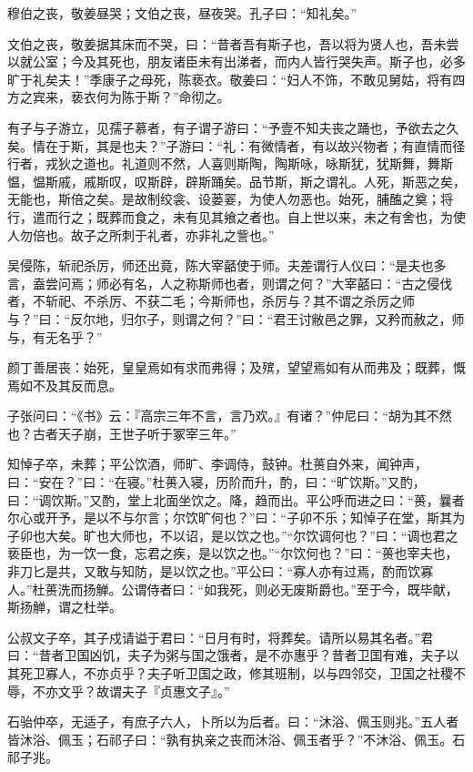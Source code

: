 \documentclass[]{article}
\begin{document}
穆伯之丧，敬姜昼哭；文伯之丧，昼夜哭。孔子曰：``知礼矣。''

文伯之丧，敬姜据其床而不哭，曰：``昔者吾有斯子也，吾以将为贤人也，吾未尝以就公室；今及其死也，朋友诸臣未有出涕者，而内人皆行哭失声。斯子也，必多旷于礼矣夫！''季康子之母死，陈亵衣。敬姜曰：``妇人不饰，不敢见舅姑，将有四方之宾来，亵衣何为陈于斯？''命彻之。

有子与子游立，见孺子慕者，有子谓子游曰：``予壹不知夫丧之踊也，予欲去之久矣。情在于斯，其是也夫？''子游曰：``礼：有微情者，有以故兴物者；有直情而径行者，戎狄之道也。礼道则不然，人喜则斯陶，陶斯咏，咏斯犹，犹斯舞，舞斯愠，愠斯戚，戚斯叹，叹斯辟，辟斯踊矣。品节斯，斯之谓礼。人死，斯恶之矣，无能也，斯倍之矣。是故制绞衾、设蒌翣，为使人勿恶也。始死，脯醢之奠；将行，遣而行之；既葬而食之，未有见其飨之者也。自上世以来，未之有舍也，为使人勿倍也。故子之所刺于礼者，亦非礼之訾也。''

吴侵陈，斩祀杀厉，师还出竟，陈大宰嚭使于师。夫差谓行人仪曰：``是夫也多言，盍尝问焉；师必有名，人之称斯师也者，则谓之何？''大宰嚭曰：``古之侵伐者，不斩祀、不杀厉、不获二毛；今斯师也，杀厉与？其不谓之杀厉之师与？''曰：``反尔地，归尔子，则谓之何？''曰：``君王讨敝邑之罪，又矜而赦之，师与，有无名乎？''

颜丁善居丧：始死，皇皇焉如有求而弗得；及殡，望望焉如有从而弗及；既葬，慨焉如不及其反而息。

子张问曰：``《书》云：『高宗三年不言，言乃欢。』有诸？''仲尼曰：``胡为其不然也？古者天子崩，王世子听于冢宰三年。''

知悼子卒，未葬；平公饮酒，师旷、李调侍，鼓钟。杜蒉自外来，闻钟声，曰：``安在？''曰：``在寝。''杜蒉入寝，历阶而升，酌，曰：``旷饮斯。''又酌，曰：``调饮斯。''又酌，堂上北面坐饮之。降，趋而出。平公呼而进之曰：``蒉，曩者尔心或开予，是以不与尔言；尔饮旷何也？''曰：``子卯不乐；知悼子在堂，斯其为子卯也大矣。旷也大师也，不以诏，是以饮之也。''``尔饮调何也？''曰：``调也君之亵臣也，为一饮一食，忘君之疾，是以饮之也。''``尔饮何也？''曰：``蒉也宰夫也，非刀匕是共，又敢与知防，是以饮之也。''平公曰：``寡人亦有过焉，酌而饮寡人。''杜蒉洗而扬觯。公谓侍者曰：``如我死，则必无废斯爵也。''至于今，既毕献，斯扬觯，谓之杜举。

公叔文子卒，其子戍请谥于君曰：``日月有时，将葬矣。请所以易其名者。''君曰：``昔者卫国凶饥，夫子为粥与国之饿者，是不亦惠乎？昔者卫国有难，夫子以其死卫寡人，不亦贞乎？夫子听卫国之政，修其班制，以与四邻交，卫国之社稷不辱，不亦文乎？故谓夫子『贞惠文子』。''

石骀仲卒，无适子，有庶子六人，卜所以为后者。曰：``沐浴、佩玉则兆。''五人者皆沐浴、佩玉；石祁子曰：``孰有执亲之丧而沐浴、佩玉者乎？''不沐浴、佩玉。石祁子兆。
\end{document}
